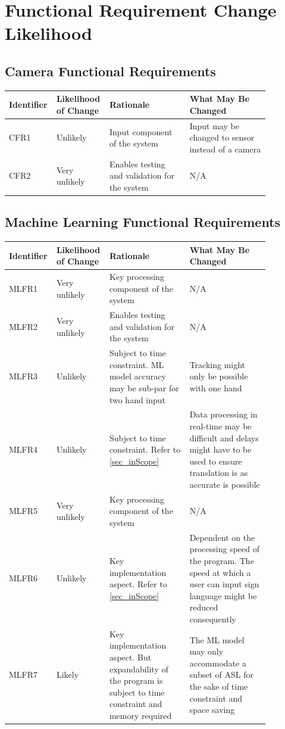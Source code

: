 \documentclass[12pt]{article}
\begin{document}
\section{Functional Requirement Change Likelihood}
\subsection{Camera Functional Requirements}

\renewcommand{\arraystretch}{1.2}
\noindent \begin{tabularx}{\textwidth}{p{0.12\linewidth}|p{0.15\linewidth}|p{0.3\linewidth}|p{0.3\linewidth}}
\toprule
\textbf{Identifier} & \textbf{Likelihood of Change} & \textbf{Rationale} & \textbf{What May Be Changed}\\
\midrule
CFR1 
& Unlikely
& Input component of the system
& Input may be changed to sensor instead of a camera\\
\hline
CFR2
& Very unlikely
& Enables testing and validation for the system
& N/A\\
\bottomrule
\end{tabularx}

\subsection{Machine Learning Functional Requirements}

\renewcommand{\arraystretch}{1.2}
\noindent \begin{tabularx}{\textwidth}{p{0.12\linewidth}|p{0.15\linewidth}|p{0.3\linewidth}|p{0.3\linewidth}}
\toprule
\textbf{Identifier} & \textbf{Likelihood of Change} & \textbf{Rationale} & \textbf{What May Be Changed}\\
\midrule
MLFR1 
& Very unlikely
& Key processing component of the system
& N/A\\
\hline
MLFR2 
& Very unlikely
& Enables testing and validation for the system
& N/A\\
\hline
MLFR3 
& Unlikely
& Subject to time constraint. ML model accuracy may be sub-par for two hand input
& Tracking might only be possible with one hand\\
\hline
MLFR4 
& Unlikely
& Subject to time constraint. Refer to \ref{sec_inScope}
& Data processing in real-time may be difficult and delays might have to be used to ensure translation is as accurate is possible\\
\hline
MLFR5 
& Very unlikely
& Key processing component of the system
& N/A\\
\hline
MLFR6 
& Unlikely
& Key implementation aspect. Refer to \ref{sec_inScope}
& Dependent on the processing speed of the program. The speed at which a user can input sign language might be reduced consequently\\
\hline
MLFR7 
& Likely
& Key implementation aspect. But expandability of the program is subject to time constraint and memory required
& The ML model may only accommodate a subset of ASL for the sake of time constraint and space saving\\
\bottomrule
\end{tabularx}
\end{document}
